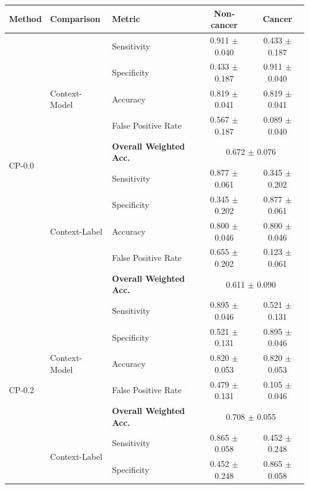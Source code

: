 \begin{table}[ht]
  \centering
  \scriptsize
  \begin{tabular}{l|llcc}
    \toprule
    Method & Comparison & Metric & Non‐cancer & Cancer \\
    \midrule
\multirow{10}{*}{CP-0.0}
  & \multirow{5}{*}{Context-Model}
      & Sensitivity            & 0.911 $\pm$ 0.040 & 0.433 $\pm$ 0.187 \\
  &   & Specificity            & 0.433 $\pm$ 0.187 & 0.911 $\pm$ 0.040 \\
  &   & Accuracy               & 0.819 $\pm$ 0.041 & 0.819 $\pm$ 0.041 \\
  &   & False Positive Rate    & 0.567 $\pm$ 0.187 & 0.089 $\pm$ 0.040 \\
  &   & \textbf{Overall Weighted Acc.}
                                & \multicolumn{2}{c}{0.672 $\pm$ 0.076} \\ \cmidrule{2-5}
  & \multirow{5}{*}{Context-Label}
      & Sensitivity            & 0.877 $\pm$ 0.061 & 0.345 $\pm$ 0.202 \\
  &   & Specificity            & 0.345 $\pm$ 0.202 & 0.877 $\pm$ 0.061 \\
  &   & Accuracy               & 0.800 $\pm$ 0.046 & 0.800 $\pm$ 0.046 \\
  &   & False Positive Rate    & 0.655 $\pm$ 0.202 & 0.123 $\pm$ 0.061 \\
  &   & \textbf{Overall Weighted Acc.}
                                & \multicolumn{2}{c}{0.611 $\pm$ 0.090} \\ \midrule
\multirow{10}{*}{CP-0.2}
  & \multirow{5}{*}{Context-Model}
      & Sensitivity            & 0.895 $\pm$ 0.046 & 0.521 $\pm$ 0.131 \\
  &   & Specificity            & 0.521 $\pm$ 0.131 & 0.895 $\pm$ 0.046 \\
  &   & Accuracy               & 0.820 $\pm$ 0.053 & 0.820 $\pm$ 0.053 \\
  &   & False Positive Rate    & 0.479 $\pm$ 0.131 & 0.105 $\pm$ 0.046 \\
  &   & \textbf{Overall Weighted Acc.}
                                & \multicolumn{2}{c}{0.708 $\pm$ 0.055} \\ \cmidrule{2-5}
  & \multirow{5}{*}{Context-Label}
      & Sensitivity            & 0.865 $\pm$ 0.058 & 0.452 $\pm$ 0.248 \\
  &   & Specificity            & 0.452 $\pm$ 0.248 & 0.865 $\pm$ 0.058 \\

\end{tabular}
\end{table}
